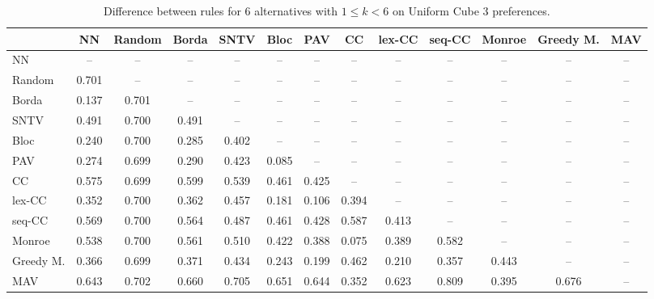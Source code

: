 
\begin{table*}[h!]
\centering
\begin{tabular}{lcccccccccccc}
\toprule
 & NN & Random & Borda & SNTV & Bloc & PAV & CC & lex-CC & seq-CC & Monroe & Greedy M. & MAV \\
\midrule
NN & -- & -- & -- & -- & -- & -- & -- & -- & -- & -- & -- & -- \\
Random & 0.701 & -- & -- & -- & -- & -- & -- & -- & -- & -- & -- & -- \\
Borda & 0.137 & 0.701 & -- & -- & -- & -- & -- & -- & -- & -- & -- & -- \\
SNTV & 0.491 & 0.700 & 0.491 & -- & -- & -- & -- & -- & -- & -- & -- & -- \\
Bloc & 0.240 & 0.700 & 0.285 & 0.402 & -- & -- & -- & -- & -- & -- & -- & -- \\
PAV & 0.274 & 0.699 & 0.290 & 0.423 & 0.085 & -- & -- & -- & -- & -- & -- & -- \\
CC & 0.575 & 0.699 & 0.599 & 0.539 & 0.461 & 0.425 & -- & -- & -- & -- & -- & -- \\
lex-CC & 0.352 & 0.700 & 0.362 & 0.457 & 0.181 & 0.106 & 0.394 & -- & -- & -- & -- & -- \\
seq-CC & 0.569 & 0.700 & 0.564 & 0.487 & 0.461 & 0.428 & 0.587 & 0.413 & -- & -- & -- & -- \\
Monroe & 0.538 & 0.700 & 0.561 & 0.510 & 0.422 & 0.388 & 0.075 & 0.389 & 0.582 & -- & -- & -- \\
Greedy M. & 0.366 & 0.699 & 0.371 & 0.434 & 0.243 & 0.199 & 0.462 & 0.210 & 0.357 & 0.443 & -- & -- \\
MAV & 0.643 & 0.702 & 0.660 & 0.705 & 0.651 & 0.644 & 0.352 & 0.623 & 0.809 & 0.395 & 0.676 & -- \\
\bottomrule
\end{tabular}

\caption{Difference between rules for 6 alternatives with $1 \leq k < 6$ on Uniform Cube 3 preferences.}
\end{table*}
